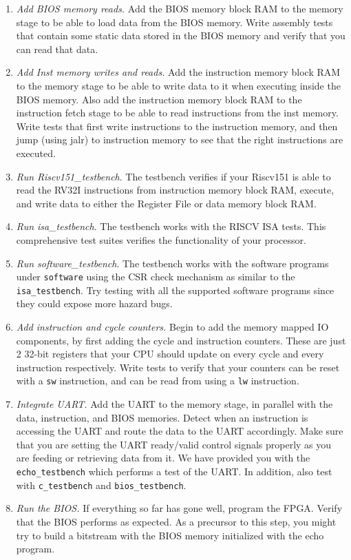 \documentclass[11pt]{article}
\begin{document}
\begin{enumerate}
  \item \textit{Add BIOS memory reads.} Add the BIOS memory block RAM to the memory stage to be able to load data from the BIOS memory. Write assembly tests that contain some static data stored in the BIOS memory and verify that you can read that data.
  \item \textit{Add Inst memory writes and reads.} Add the instruction memory block RAM to the memory stage to be able to write data to it when executing inside the BIOS memory. Also add the instruction memory block RAM to the instruction fetch stage to be able to read instructions from the inst memory. Write tests that first write instructions to the instruction memory, and then jump (using jalr) to instruction memory to see that the right instructions are executed.
  \item \textit{Run Riscv151\_testbench}. The testbench verifies if your Riscv151 is able to read the RV32I instructions from instruction memory block RAM, execute, and write data to either the Register File or data memory block RAM.
  \item \textit{Run isa\_testbench}. The testbench works with the RISCV ISA tests. This comprehensive test suites verifies the functionality of your processor.
  \item \textit{Run software\_testbench}. The testbench works with the software programs under \verb|software| using the CSR check mechanism as similar to the \verb|isa_testbench|. Try testing with all the supported software programs since they could expose more hazard bugs.
  \item \textit{Add instruction and cycle counters.} Begin to add the memory mapped IO components, by first adding the cycle and instruction counters. These are just 2 32-bit registers that your CPU should update on every cycle and every instruction respectively. Write tests to verify that your counters can be reset with a \verb|sw| instruction, and can be read from using a \verb|lw| instruction.
  \item \textit{Integrate UART.} Add the UART to the memory stage, in parallel with the data, instruction, and BIOS memories. Detect when an instruction is accessing the UART and route the data to the UART accordingly. Make sure that you are setting the UART ready/valid control signals properly as you are feeding or retrieving data from it. We have provided you with the \verb|echo_testbench| which performs a test of the UART. In addition, also test with \verb|c_testbench| and \verb|bios_testbench|.
  \item \textit{Run the BIOS.} If everything so far has gone well, program the FPGA. Verify that the BIOS performs as expected. As a precursor to this step, you might try to build a bitstream with the BIOS memory initialized with the echo program.

\end{enumerate}
\end{document}
